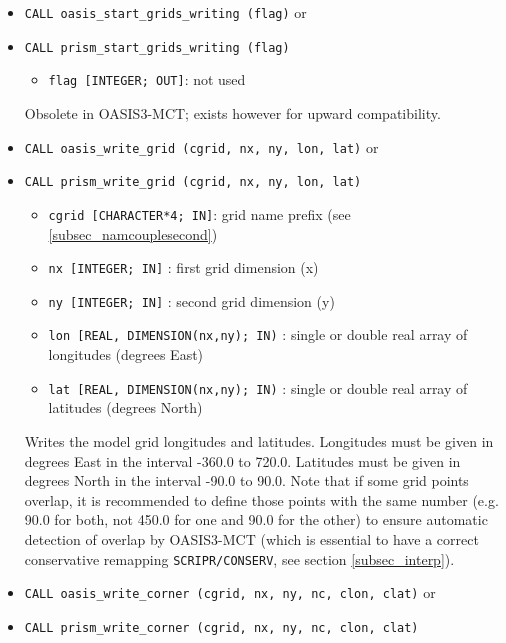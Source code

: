 \begin{itemize}

\item {\tt CALL oasis\_start\_grids\_writing (flag)} or
\item {\tt CALL prism\_start\_grids\_writing (flag)}
  \begin{itemize}
  \item {\tt flag [INTEGER; OUT]}: not used
  \end{itemize}
  Obsolete in OASIS3-MCT; exists however for upward compatibility.

  \vspace{0.2cm}
\item {\tt CALL oasis\_write\_grid (cgrid, nx, ny, lon, lat)} or
\item {\tt CALL prism\_write\_grid (cgrid, nx, ny, lon, lat)}
        
  \begin{itemize}
  \item {\tt cgrid [CHARACTER*4; IN]}: grid name prefix (see
    \ref{subsec_namcouplesecond})
  \item {\tt nx [INTEGER; IN]} : first grid dimension (x)
  \item {\tt ny [INTEGER; IN]} : second grid dimension (y)
  \item {\tt lon [REAL, DIMENSION(nx,ny); IN)} : single or double real array of longitudes
    (degrees East)
  \item {\tt lat [REAL, DIMENSION(nx,ny); IN)} : single or double real array of latitudes
    (degrees North)
  \end{itemize}

  Writes the model grid longitudes and latitudes. Longitudes must be
  given in degrees East in the interval -360.0 to 720.0. Latitudes
  must be given in degrees North in the interval -90.0 to 90.0. Note
  that if some grid points overlap, it is recommended to define those
  points with the same number (e.g. 90.0 for both, not 450.0 for one
  and 90.0 for the other) to ensure automatic detection of overlap by
  OASIS3-MCT (which is essential to have a correct conservative
  remapping \texttt{SCRIPR/CONSERV}, see section \ref{subsec_interp}).

  \vspace{0.2cm}
\item {\tt CALL oasis\_write\_corner (cgrid, nx, ny, nc, clon, clat)}
  or
\item {\tt CALL prism\_write\_corner (cgrid, nx, ny, nc, clon, clat)}


\end{itemize}
